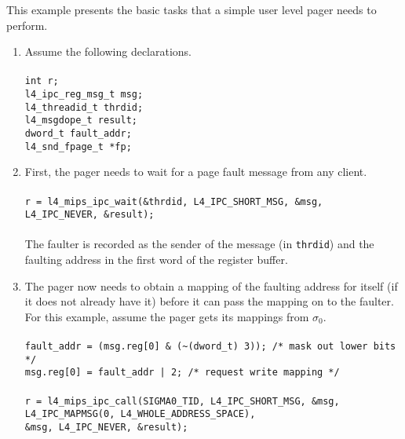 
This example presents the basic tasks that a simple user level pager
needs to perform.

\begin{enumerate}

\item Assume the following declarations. \\ \\
  \hspace*{20pt} {\footnotesize\verb+int r;+}\\
  \hspace*{20pt} {\footnotesize\verb+l4_ipc_reg_msg_t msg;+}\\
  \hspace*{20pt} {\footnotesize\verb+l4_threadid_t thrdid;+}\\
  \hspace*{20pt} {\footnotesize\verb+l4_msgdope_t result;+}\\
  \hspace*{20pt} {\footnotesize\verb+dword_t fault_addr;+}\\
  \hspace*{20pt} {\footnotesize\verb+l4_snd_fpage_t *fp;+}

\item First, the pager needs to wait for a page fault message from
  any client. \\ \\
  \hspace*{20pt} {\footnotesize\verb+r = l4_mips_ipc_wait(&thrdid, L4_IPC_SHORT_MSG, &msg,+}\\
  \hspace*{130pt} {\footnotesize\verb+L4_IPC_NEVER, &result);+} \\ \\
  The faulter is recorded as the sender of the message (in {\footnotesize\verb+thrdid+})
  and the faulting address in the first word of the register buffer.
  
\item The pager now needs to obtain a mapping of the faulting
  address for itself (if it does not already have it) before it can
  pass the mapping on to the faulter. For this example, assume the pager
  gets its mappings from $\sigma_0$. \\ \\
  \hspace*{20pt} {\footnotesize\verb+fault_addr = (msg.reg[0] & (~(dword_t) 3)); /* mask out lower bits */+}\\
  \hspace*{20pt} {\footnotesize\verb+msg.reg[0] = fault_addr | 2; /* request write mapping */+}\\ \\
  \hspace*{20pt} {\footnotesize\verb+r = l4_mips_ipc_call(SIGMA0_TID, L4_IPC_SHORT_MSG, &msg,+}\\
  \hspace*{130pt} {\footnotesize\verb+L4_IPC_MAPMSG(0, L4_WHOLE_ADDRESS_SPACE),+}\\
  \hspace*{130pt} {\footnotesize\verb+&msg, L4_IPC_NEVER, &result);+}
  

\end{enumerate}
